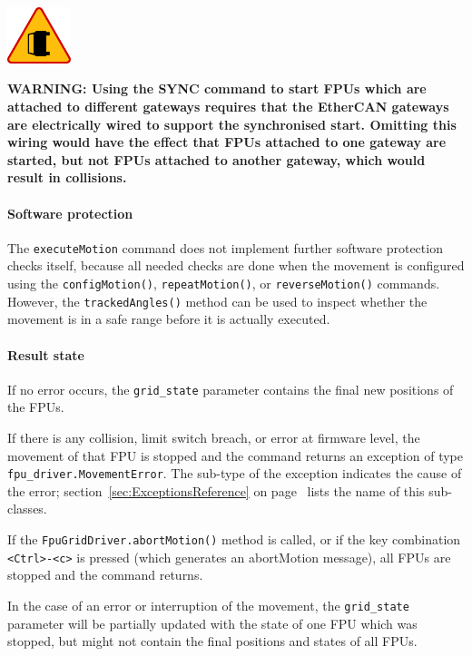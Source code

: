 \documentclass[fontsize=12,a4paper]{scrreprt}
\newenvironment{warning}{\begin{framed}\includegraphics[width=5em]{accident-area-ahead.png}
}{\end{framed}}
\begin{document}
\begin{warning}
  \textbf{WARNING: Using the SYNC command to start FPUs which are
    attached to different gateways requires that the EtherCAN gateways
    are electrically wired to support the synchronised start. Omitting
    this wiring would have the effect that FPUs attached to one
    gateway are started, but not FPUs attached to another gateway,
    which would result in collisions.}
\end{warning}



\paragraph{Software protection}
The \texttt{executeMotion} command does not implement further software
protection checks itself, because all needed checks are done when the
movement is configured using the \texttt{configMotion()},
\texttt{repeatMotion()}, or \texttt{reverseMotion()}
commands. However, the \texttt{trackedAngles()} method can be used to
inspect whether the movement is in a safe range before it is actually
executed.

\paragraph{Result state}
If no error occurs, the \texttt{grid\_state} parameter contains the
final new positions of the FPUs.

If there is any collision, limit switch breach, or error at firmware
level, the movement of that FPU is stopped and the command returns an
exception of type \texttt{fpu\_driver.MovementError}. The sub-type of
the exception indicates the cause of the error;
section~\ref{sec:ExceptionsReference} on
page~\pageref{sec:ExceptionsReference} lists the name of this
sub-classes.

If the \texttt{FpuGridDriver.abortMotion()} method is called, or if
the key combination \texttt{<Ctrl>-<c>} is pressed (which generates an
abortMotion message), all FPUs are stopped and the command returns.

In the case of an error or interruption of the movement, the
\texttt{grid\_state} parameter will be partially updated with the
state of one FPU which was stopped, but might not contain the final
positions and states of all FPUs.
\end{document}

